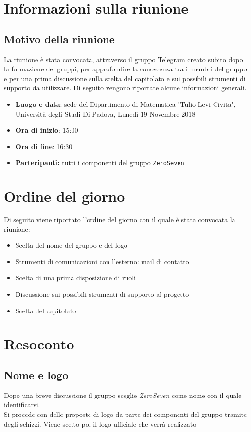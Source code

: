\documentclass[a4paper,12pt]{article}
\begin{document}
	\tableofcontents
	\cleardoublepage
	
	\section{Informazioni sulla riunione}
	\subsection{Motivo della riunione}
	La riunione è stata convocata, attraverso il gruppo Telegram creato subito dopo la formazione dei gruppi, per approfondire la conoscenza tra i membri del gruppo e per una prima discussione sulla scelta del capitolato e  sui possibili strumenti di supporto da utilizzare. 
	Di seguito vengono riportate alcune informazioni generali.
	\begin{itemize}
		\item \textbf{Luogo e data}: sede del Dipartimento di Matematica "Tulio Levi-Civita", Università degli Studi Di Padova, Lunedì 19 Novembre 2018
		\item \textbf{Ora di inizio}: 15:00
		\item \textbf{Ora di fine}: 16:30
		\item \textbf{Partecipanti: } tutti i componenti del gruppo \texttt{ZeroSeven} 
	\end{itemize}
	\section{Ordine del giorno}
	Di seguito viene riportato l'ordine del giorno con il quale è stata convocata la riunione:
	\begin{itemize}
		\item Scelta del nome del gruppo e del logo
		\item Strumenti di comunicazioni con l'esterno: mail di contatto
		\item Scelta di una prima disposizione di ruoli
		\item Discussione sui possibili strumenti di supporto al progetto
		\item Scelta del capitolato
	\end{itemize}
	\section{Resoconto}
	\subsection{Nome e logo}
	Dopo una breve discussione il gruppo sceglie \textit{ZeroSeven} come nome con il quale identificarsi.\\
	Si procede con delle proposte di logo da parte dei componenti del gruppo tramite degli schizzi. Viene scelto poi il logo ufficiale che verrà realizzato.
\end{document}
